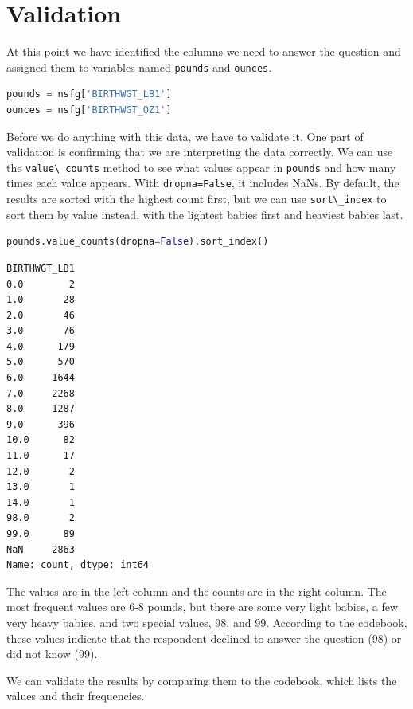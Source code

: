 \section{Validation}\label{validation}

At this point we have identified the columns we need to answer the
question and assigned them to variables named
\passthrough{\lstinline!pounds!} and \passthrough{\lstinline!ounces!}.

\begin{lstlisting}[language=Python,style=source]
pounds = nsfg['BIRTHWGT_LB1']
ounces = nsfg['BIRTHWGT_OZ1']
\end{lstlisting}

Before we do anything with this data, we have to validate it. One part
of validation is confirming that we are interpreting the data correctly.
We can use the \passthrough{\lstinline!value\_counts!} method to see
what values appear in \passthrough{\lstinline!pounds!} and how many
times each value appears. With \passthrough{\lstinline!dropna=False!},
it includes NaNs. By default, the results are sorted with the highest
count first, but we can use \passthrough{\lstinline!sort\_index!} to
sort them by value instead, with the lightest babies first and heaviest
babies last.

\begin{lstlisting}[language=Python,style=source]
pounds.value_counts(dropna=False).sort_index()
\end{lstlisting}

\begin{lstlisting}[style=output]
BIRTHWGT_LB1
0.0        2
1.0       28
2.0       46
3.0       76
4.0      179
5.0      570
6.0     1644
7.0     2268
8.0     1287
9.0      396
10.0      82
11.0      17
12.0       2
13.0       1
14.0       1
98.0       2
99.0      89
NaN     2863
Name: count, dtype: int64
\end{lstlisting}

The values are in the left column and the counts are in the right
column. The most frequent values are 6-8 pounds, but there are some very
light babies, a few very heavy babies, and two special values, 98, and
99. According to the codebook, these values indicate that the respondent
declined to answer the question (98) or did not know (99).

We can validate the results by comparing them to the codebook, which
lists the values and their frequencies.

